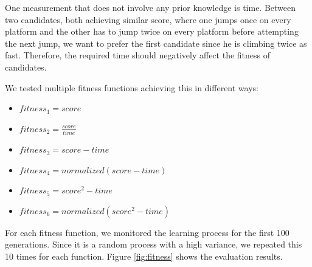 \documentclass[a4paper,12pt,pagesize,headsepline,bibtotoc,titlepage,abstracton]{scrartcl}
\begin{document}
One measurement that does not involve any prior knowledge is time. Between two candidates, both achieving similar score, where one jumps once on every platform and the other has to jump twice on every platform before attempting the next jump, we want to prefer the first candidate since he is climbing twice as fast. Therefore, the required time should negatively affect the fitness of candidates.

We tested multiple fitness functions achieving this in different ways:
\begin{itemize}
\item $fitness_1 = score$
\item $fitness_2 = \frac{score}{time}$
\item $fitness_3 = score - time$
\item $fitness_4 = normalized(score - time)$
\item $fitness_5 = score^2 - time$
\item $fitness_6 = normalized(score^2 - time)$
\end{itemize}

For each fitness function, we monitored the learning process for the first 100 generations. Since it is a random process with a high variance, we repeated this 10 times for each function. Figure \ref{fig:fitness} shows the evaluation results. 
\end{document}
